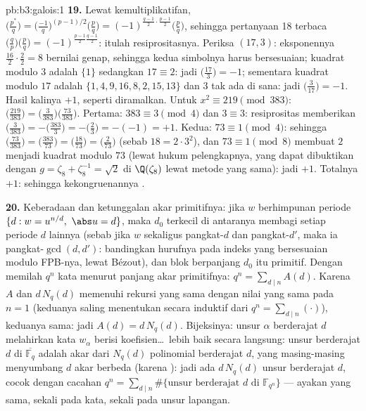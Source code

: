 \begin{solution}{pb:b3:galois:1}
\textbf{19.} Lewat kemultiplikatifan, $\bigl(\frac{p^*}q\bigr) =
\bigl(\frac{-1}q\bigr)^{(p-1)/2}\bigl(\frac pq\bigr) =
(-1)^{\frac{q-1}2\cdot\frac{p-1}2}\bigl(\frac pq\bigr)$,
sehingga pertanyaan 18 terbaca $\bigl(\frac qp\bigr)\bigl(\frac
pq\bigr) = (-1)^{\frac{p-1}2\frac{q-1}2}$: itulah resiprositasnya.
Periksa $(17, 3)$: eksponennya $\frac{16}2\cdot\frac22 = 8$
bernilai genap, sehingga kedua simbolnya harus bersesuaian; kuadrat modulo $3$ adalah $\{1\}$ sedangkan $17 \equiv 2$:
jadi $\bigl(\frac{17}3\bigr) = -1$; sementara kuadrat modulo $17$ adalah $\{1, 4,
9, 16, 8, 2, 15, 13\}$ dan $3$ tak ada di sana:
jadi $\bigl(\frac3{17}\bigr) = -1$. Hasil kalinya $+1$, seperti diramalkan. Untuk $x^2
\equiv 219 \pmod{383}$: $\bigl(\frac{219}{383}\bigr) =
\bigl(\frac3{383}\bigr)\bigl(\frac{73}{383}\bigr)$. Pertama:
$383 \equiv 3 \pmod4$ dan $3 \equiv 3$: resiprositas memberikan
$\bigl(\frac3{383}\bigr) = -\bigl(\frac{383}3\bigr) =
-\bigl(\frac23\bigr) = -(-1) = +1$. Kedua: $73 \equiv 1
\pmod 4$: sehingga $\bigl(\frac{73}{383}\bigr) =
\bigl(\frac{383}{73}\bigr) = \bigl(\frac{18}{73}\bigr) =
\bigl(\frac2{73}\bigr)$ (sebab $18 = 2\cdot3^2$), dan $73 \equiv 1
\pmod 8$ membuat $2$ menjadi kuadrat modulo $73$ (lewat hukum pelengkapnya,
yang dapat dibuktikan dengan $g = \zeta_8 + \zeta_8^{-1} = \sqrt2$ di
$\Q(\zeta_8)$ lewat metode yang sama): jadi $+1$. Totalnya $+1$: sehingga
kekongruenannya .

\textbf{20.} Keberadaan dan ketunggalan akar primitifnya:
jika $w$ berhimpunan periode $\{d : w = u^{n/d},\ \abs u = d\}$,
maka $d_0$ terkecil di antaranya membagi setiap periode $d$ lainnya
(sebab jika $w$ sekaligus pangkat-$d$ dan pangkat-$d'$, maka ia
pangkat-$\gcd(d, d')$: bandingkan hurufnya pada indeks yang bersesuaian
modulo FPB-nya, lewat Bézout), dan blok berpanjang $d_0$ itu
primitif. Dengan memilah $q^n$ kata menurut panjang akar
primitifnya: $q^n = \sum_{d \mid n}A(d)$. Karena $A$ dan
$d\,N_q(d)$ memenuhi rekursi yang sama dengan nilai yang sama
pada $n = 1$ (keduanya saling menentukan secara induktif dari $q^n
= \sum_{d\mid n}(\cdot)$), keduanya sama: jadi $A(d) =
d\,N_q(d)$. Bijeksinya: unsur $\alpha$ berderajat $d$
melahirkan kata $w_\alpha$ berisi koefisien\dots\
lebih baik secara langsung: unsur berderajat $d$ di
$\overline{\mathbb F_q}$ adalah akar dari $N_q(d)$
polinomial  berderajat $d$, yang masing-masing menyumbang $d$
akar berbeda (karena \omterm{def:b3:galois:separable}{separabel}): jadi ada $d\,N_q(d)$ unsur
berderajat $d$, cocok dengan cacahan $q^n = \sum_{d\mid n}\#\{
\text{unsur berderajat } d \text{ di } \mathbb F_{q^n}\}$
--- ayakan yang sama, sekali pada kata, sekali pada unsur lapangan.


\end{solution}
